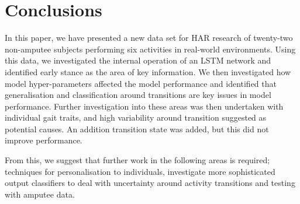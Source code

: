 \documentclass[sensors,article,submit,moreauthors,pdftex]{Definitions/mdpi}
\begin{document}
\section{Conclusions}
\label{sec:conclusion}
In this paper, we have presented a new data set for HAR research of twenty-two non-amputee subjects performing six activities in real-world environments. Using this data, we investigated the internal operation of an LSTM network and identified early stance as the area of key information. We then investigated how model hyper-parameters affected the model performance and identified that generalisation and classification around transitions are key issues in model performance. Further investigation into these areas was then undertaken with individual gait traits, and high variability around transition suggested as potential causes. An addition transition state was added, but this did not improve performance. 

From this, we suggest that further work in the following areas is required; techniques for personalisation to individuals, investigate more sophisticated output classifiers to deal with uncertainty around activity transitions and testing with amputee data.


\vspace{6pt} 


\end{document}
